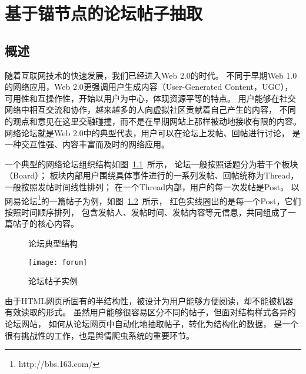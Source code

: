 
\chapter{基于锚节点的论坛帖子抽取}

\section{概述}
\label{sec:pean-intro}

随着互联网技术的快速发展，我们已经进入Web 2.0的时代。
不同于早期Web 1.0的网络应用，Web 2.0更强调用户生成内容（User-Generated Content，UGC），
可用性和互操作性，开始以用户为中心，体现资源平等的特点。
用户能够在社交网络中相互交流和协作，越来越多的人向虚拟社区贡献着自己产生的内容，
不同的观点和意见在这里交融碰撞，而不是在早期网站上那样被动地接收有限的内容。
网络论坛就是Web 2.0中的典型代表，用户可以在论坛上发帖、回帖进行讨论，
是一种交互性强、内容丰富而及时的网络应用。

一个典型的网络论坛组织结构如图~\ref{fig:forum-structure}~所示，
论坛一般按照话题分为若干个板块（Board）；
板块内部用户围绕具体事件进行的一系列发帖、回帖统称为Thread，一般按照发帖时间线性排列；
在一个Thread内部，用户的每一次发帖是Post。
以网易论坛\footnote{http://bbs.163.com/}的一篇帖子为例，如图~\ref{fig:forum}~所示，
红色实线圈出的是每一个Post，它们按照时间顺序排列，
包含发帖人、发帖时间、发帖内容等元信息，共同组成了一篇帖子的核心内容。

\begin{figure}[htbp]
\centering
{}
\caption{论坛典型结构}
\label{fig:forum-structure}
\end{figure}

\begin{figure}[htbp]
\centering
\texttt{[image: forum]}
\caption{论坛帖子实例}
\label{fig:forum}
\end{figure}

由于HTML网页所固有的半结构性，被设计为用户能够方便阅读，却不能被机器有效读取的形式。
虽然用户能够很容易区分不同的帖子，但面对结构样式各异的论坛网站，
如何从论坛网页中自动化地抽取帖子，转化为结构化的数据，
是一个很有挑战性的工作，也是舆情爬虫系统的重要环节。

